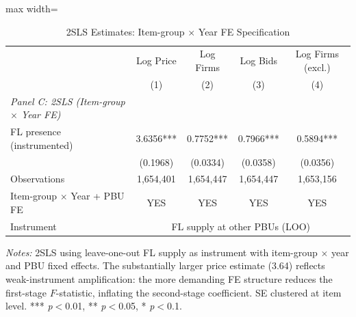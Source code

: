 \begin{table}[htbp]
\centering
\caption{2SLS Estimates: Item-group $\times$ Year FE Specification}
\label{tab:iv_panelc}
\begin{adjustbox}{max width=\textwidth}
\begin{threeparttable}
\small
\begin{tabular}{lcccc}
\toprule
 & Log Price & Log Firms & Log Bids & Log Firms (excl.) \\
 & (1) & (2) & (3) & (4) \\
\midrule
\textit{Panel C: 2SLS (Item-group $\times$ Year FE)} & & & & \\
FL presence (instrumented) & 3.6356*** & 0.7752*** & 0.7966*** & 0.5894*** \\
 & (0.1968) & (0.0334) & (0.0358) & (0.0356) \\
Observations & 1,654,401 & 1,654,447 & 1,654,447 & 1,653,156 \\
\midrule
Item-group $\times$ Year + PBU FE & YES & YES & YES & YES \\
Instrument & \multicolumn{4}{c}{FL supply at other PBUs (LOO)} \\
\bottomrule
\end{tabular}
\begin{tablenotes}
\small
\item \textit{Notes:} 2SLS using leave-one-out FL supply as instrument
with item-group $\times$ year and PBU fixed effects.
The substantially larger price estimate (3.64) reflects weak-instrument
amplification: the more demanding FE structure reduces the first-stage
$F$-statistic, inflating the second-stage coefficient.
SE clustered at item level.
*** \textit{p}$<$0.01, ** \textit{p}$<$0.05, * \textit{p}$<$0.1.
\end{tablenotes}
\end{threeparttable}
\end{adjustbox}
\end{table}
